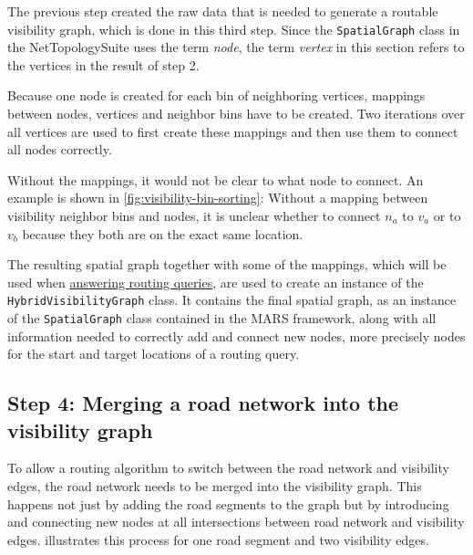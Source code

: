 		The previous step created the raw data that is needed to generate a routable visibility graph, which is done in this third step.
		Since the \texttt{SpatialGraph} class in the NetTopologySuite uses the term \emph{node}, the term \emph{vertex} in this section refers to the vertices in the result of step 2.
		
		Because one node is created for each bin of neighboring vertices, mappings between nodes, vertices and neighbor bins have to be created.
		Two iterations over all vertices are used to first create these mappings and then use them to connect all nodes correctly.
		
		Without the mappings, it would not be clear to what node to connect.
		An example is shown in \cref{fig:visibility-bin-sorting}:
		Without a mapping between visibility neighbor bins and nodes, it is unclear whether to connect $n_a$ to $v_a$ or to $v_b$ because they both are on the exact same location.
		
		The resulting spatial graph together with some of the mappings, which will be used when \hyperref[sec:answering-queries]{answering routing queries}, are used to create an instance of the \texttt{HybridVisibilityGraph} class.
		It contains the final spatial graph, as an instance of the \texttt{SpatialGraph} class contained in the MARS framework, along with all information needed to correctly add and connect new nodes, more precisely nodes for the start and target locations of a routing query.
		
	\subsection{Step 4: Merging a road network into the visibility graph}
	\label{subsec:step-4-graph merging}
	
		To allow a routing algorithm to switch between the road network and visibility edges, the road network needs to be merged into the visibility graph.
		This happens not just by adding the road segments to the graph but by introducing and connecting new nodes at all intersections between road network and visibility edges.
		 illustrates this process for one road segment and two visibility edges.
		
